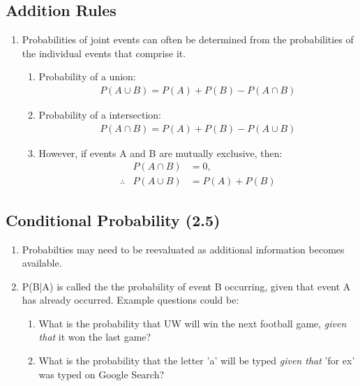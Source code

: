 \documentclass[../INDE315.tex]{subfiles}
\begin{document}
\subsection*{Addition Rules}
\begin{enumerate}
    \item Probabilities of joint events can often be determined from the probabilities of the individual events that comprise it.
        \begin{enumerate}
            \item Probability of a union:
                \begin{equation*}
                    \begin{aligned}
                        P(A \cup B) = P(A) + P(B) - P(A \cap B) 
                    \end{aligned}
                \end{equation*}
            \item Probability of a intersection:
                \begin{equation*}
                    \begin{aligned}
                        P(A \cap B) = P(A) + P(B) - P(A \cup B) 
                    \end{aligned}
                \end{equation*}
            \item However, if events A and B are mutually exclusive, then:
                \begin{equation*}
                    \begin{aligned}
                        & P(A \cap B) &= 0, \\
                        \therefore & P(A \cup B) &= P(A) + P(B)
                    \end{aligned}
                \end{equation*}
        \end{enumerate}
\end{enumerate}


\subsection*{Conditional Probability (2.5)}
\begin{enumerate}
    \item Probabilties may need to be reevaluated as additional information becomes available.
    \item P(B|A) is called the the probability of event B occurring, given that event A has already occurred. Example questions could be:
        \begin{enumerate}
            \item What is the probability that UW will win the next football game, \emph{given that} it won the last game?
            \item What is the probability that the letter 'a' will be typed \emph{given that} 'for ex' was typed on Google Search?
        \end{enumerate}
\end{enumerate}
\end{document}
